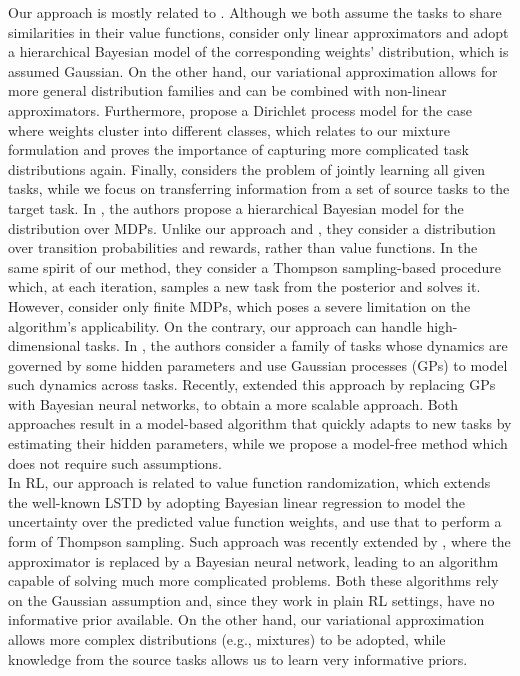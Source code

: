 \documentclass{article}
\begin{document}
Our approach is mostly related to \cite{lazaric2010bayesian}. Although we both assume the tasks to share similarities in their value functions, \cite{lazaric2010bayesian} consider only linear approximators and adopt a hierarchical Bayesian model of the corresponding weights' distribution, which is assumed Gaussian. On the other hand, our variational approximation allows for more general distribution families and can be combined with non-linear approximators. Furthermore, \cite{lazaric2010bayesian} propose a Dirichlet process model for the case where weights cluster into different classes, which relates to our mixture formulation and proves the importance of capturing more complicated task distributions again. Finally, \cite{lazaric2010bayesian} considers the problem of jointly learning all given tasks, while we focus on transferring information from a set of source tasks to the target task. In \cite{wilson2007multi}, the authors propose a hierarchical Bayesian model for the distribution over MDPs. Unlike our approach and \cite{lazaric2010bayesian}, they consider a distribution over transition probabilities and rewards, rather than value functions. In the same spirit of our method, they consider a Thompson sampling-based procedure which, at each iteration, samples a new task from the posterior and solves it. However, \cite{wilson2007multi} consider only finite MDPs, which poses a severe limitation on the algorithm's applicability. On the contrary, our approach can handle high-dimensional tasks. In \cite{doshi2016hidden}, the authors consider a family of tasks whose dynamics are governed by some hidden parameters and use Gaussian processes (GPs) to model such dynamics across tasks. Recently, \cite{killian2017robust} extended this approach by replacing GPs with Bayesian neural networks, to obtain a more scalable approach. Both approaches result in a model-based algorithm that quickly adapts to new tasks by estimating their hidden parameters, while we propose a model-free method which does not require such assumptions.\\
In RL, our approach is related to value function randomization\cite{osband2014generalization}, which extends the well-known LSTD \cite{boyan1999least} by adopting Bayesian linear regression to model the uncertainty over the predicted value function weights, and use that to perform a form of Thompson sampling. Such approach was recently extended by \cite{azizzadenesheli2018efficient}, where the approximator is replaced by a Bayesian neural network, leading to an algorithm capable of solving much more complicated problems. Both these algorithms rely on the Gaussian assumption and, since they work in plain RL settings, have no informative prior available. On the other hand, our variational approximation allows more complex distributions (e.g., mixtures) to be adopted, while knowledge from the source tasks allows us to learn very informative priors.
\end{document}
